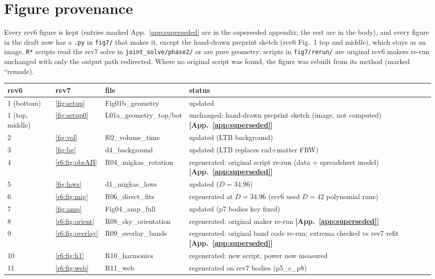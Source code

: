 \documentclass[11pt]{article}
\begin{document}
\section{Figure provenance}
Every rev6 figure is kept (entries marked App.~\ref{app:superseded} are in the superseded appendix; the rest are in the body), and every figure in the draft now has a \texttt{.py} in \texttt{fig7/} that makes it, except the hand-drawn preprint sketch (rev6 Fig.~1 top and middle), which stays as an image. \texttt{R*} scripts read the rev7 solve in \texttt{joint\_solve/phase2/} or are pure geometry; scripts in \texttt{fig7/rerun/} are original rev6 makers re-run unchanged with only the output path redirected. Where no original script was found, the figure was rebuilt from its method (marked ``remade).
\begin{longtable}{@{}lllp{6.2cm}@{}}\toprule
rev6 & rev7 & file & status\\\midrule\endhead
1 (bottom) & \ref{fig:setup} & Fig01b\_geometry & updated\\
1 (top, middle) & \ref{fig:setup0} & L01a\_geometry\_top/bot & unchanged: hand-drawn preprint sketch (image, not computed) \textbf{[App.~\ref{app:superseded}]}\\
2 & \ref{fig:vol} & f02\_volume\_time & updated (LTB background)\\
3 & \ref{fig:bg} & d4\_background & updated (LTB replaces rad+matter FRW)\\
4 & \ref{r6:fig:obsAB} & R04\_migkas\_rotation & regenerated: original script re-run (data + spreadsheet model) \textbf{[App.~\ref{app:superseded}]}\\
5 & \ref{fig:laws} & d1\_migkas\_laws & updated ($D=34.96$)\\
6 & \ref{r6:fig:mig} & R06\_direct\_fits & regenerated at $D=34.96$ (rev6 used $D=42$ polynomial runs)\\
7 & \ref{fig:amp} & Fig04\_amp\_full & updated (p7 bodies key fixed)\\
8 & \ref{r6:fig:orient} & R08\_sky\_orientation & regenerated: original maker re-run \textbf{[App.~\ref{app:superseded}]}\\
9 & \ref{r6:fig:overlay} & R09\_overlay\_bands & regenerated: original band code re-run; extrema checked vs rev7 refit \textbf{[App.~\ref{app:superseded}]}\\
10 & \ref{r6:fig:h1} & R10\_harmonics & regenerated: new script, power now measured\\
11 & \ref{r6:fig:web} & R11\_web & regenerated on rev7 bodies (p5\_c\_p8)\\

\end{longtable}
\end{document}
